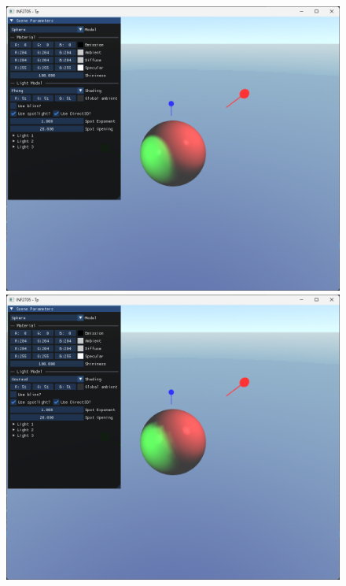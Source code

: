 \documentclass{article}[letterpaper, 11pt]
\begin{document}
\begin{figure}[h]
	\begin{minipage}[c]{.33\linewidth}
		 \centering
		 \includegraphics[scale = 0.16]{image_12.png}
	\end{minipage}
	\begin{minipage}[c]{.33\linewidth}
		 \centering
		 \includegraphics[scale = 0.16]{image_13.png}
	\end{minipage}
	\begin{minipage}[c]{.33\linewidth}

\end{minipage}
\end{figure}
\end{document}
